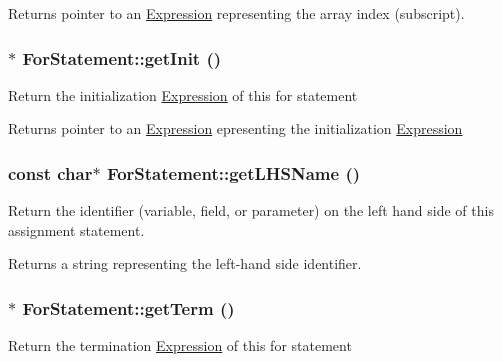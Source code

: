 \begin{DoxyReturn}{Returns}
pointer to an \hyperlink{classExpression}{Expression} representing the array index (subscript). 
\end{DoxyReturn}
\hypertarget{classForStatement_a114c3ab74b627e7dcf33868864596d97}{
\subsubsection[{getInit}]{$\ast$ ForStatement::getInit ()}}
\label{classForStatement_a114c3ab74b627e7dcf33868864596d97}
Return the initialization \hyperlink{classExpression}{Expression} of this for statement

\begin{DoxyReturn}{Returns}
pointer to an \hyperlink{classExpression}{Expression} epresenting the initialization \hyperlink{classExpression}{Expression} 
\end{DoxyReturn}
\hypertarget{classForStatement_a15ffa4871bab8d925468d7171e621562}{
\subsubsection[{getLHSName}]{\setlength{\rightskip}{0pt plus 5cm}const char$\ast$ ForStatement::getLHSName ()}}
\label{classForStatement_a15ffa4871bab8d925468d7171e621562}
Return the identifier (variable, field, or parameter) on the left hand side of this assignment statement.

\begin{DoxyReturn}{Returns}
a string representing the left-\/hand side identifier. 
\end{DoxyReturn}
\hypertarget{classForStatement_a7ecbeae3c4766ceb9510e02740284467}{
\subsubsection[{getTerm}]{$\ast$ ForStatement::getTerm ()}}
\label{classForStatement_a7ecbeae3c4766ceb9510e02740284467}
Return the termination \hyperlink{classExpression}{Expression} of this for statement

